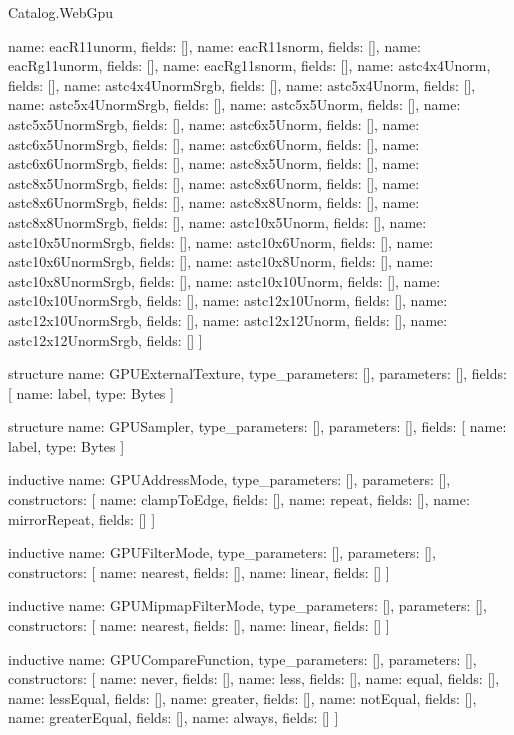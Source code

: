 \begin{lexlean}{Catalog.WebGpu}
\begin{semanticmodule}
{    {name: eacR11unorm, fields: []},
    {name: eacR11snorm, fields: []},
    {name: eacRg11unorm, fields: []},
    {name: eacRg11snorm, fields: []},
    {name: astc4x4Unorm, fields: []},
    {name: astc4x4UnormSrgb, fields: []},
    {name: astc5x4Unorm, fields: []},
    {name: astc5x4UnormSrgb, fields: []},
    {name: astc5x5Unorm, fields: []},
    {name: astc5x5UnormSrgb, fields: []},
    {name: astc6x5Unorm, fields: []},
    {name: astc6x5UnormSrgb, fields: []},
    {name: astc6x6Unorm, fields: []},
    {name: astc6x6UnormSrgb, fields: []},
    {name: astc8x5Unorm, fields: []},
    {name: astc8x5UnormSrgb, fields: []},
    {name: astc8x6Unorm, fields: []},
    {name: astc8x6UnormSrgb, fields: []},
    {name: astc8x8Unorm, fields: []},
    {name: astc8x8UnormSrgb, fields: []},
    {name: astc10x5Unorm, fields: []},
    {name: astc10x5UnormSrgb, fields: []},
    {name: astc10x6Unorm, fields: []},
    {name: astc10x6UnormSrgb, fields: []},
    {name: astc10x8Unorm, fields: []},
    {name: astc10x8UnormSrgb, fields: []},
    {name: astc10x10Unorm, fields: []},
    {name: astc10x10UnormSrgb, fields: []},
    {name: astc12x10Unorm, fields: []},
    {name: astc12x10UnormSrgb, fields: []},
    {name: astc12x12Unorm, fields: []},
    {name: astc12x12UnormSrgb, fields: []}
  ]
}

structure{
  name: GPUExternalTexture,
  type_parameters: [],
  parameters: [],
  fields: [
    {name: label, type: Bytes}
  ]
}

structure{
  name: GPUSampler,
  type_parameters: [],
  parameters: [],
  fields: [
    {name: label, type: Bytes}
  ]
}

inductive{
  name: GPUAddressMode,
  type_parameters: [],
  parameters: [],
  constructors: [
    {name: clampToEdge, fields: []},
    {name: repeat, fields: []},
    {name: mirrorRepeat, fields: []}
  ]
}

inductive{
  name: GPUFilterMode,
  type_parameters: [],
  parameters: [],
  constructors: [
    {name: nearest, fields: []},
    {name: linear, fields: []}
  ]
}

inductive{
  name: GPUMipmapFilterMode,
  type_parameters: [],
  parameters: [],
  constructors: [
    {name: nearest, fields: []},
    {name: linear, fields: []}
  ]
}

inductive{
  name: GPUCompareFunction,
  type_parameters: [],
  parameters: [],
  constructors: [
    {name: never, fields: []},
    {name: less, fields: []},
    {name: equal, fields: []},
    {name: lessEqual, fields: []},
    {name: greater, fields: []},
    {name: notEqual, fields: []},
    {name: greaterEqual, fields: []},
    {name: always, fields: []}
  ]
}


\end{semanticmodule}
\end{lexlean}
